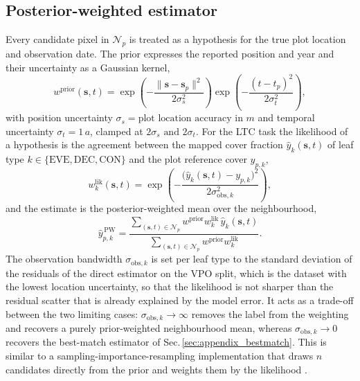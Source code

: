\documentclass[essd, manuscript]{copernicus}
\begin{document}
\subsection{Posterior-weighted estimator}
\label{sec:appendix_posterior}

Every candidate pixel in $\mathcal{N}_p$ is treated as a hypothesis for the true plot location and observation date. The prior expresses the reported position and year and their uncertainty as a Gaussian kernel,
\begin{equation}
w^\mathrm{prior}(\mathbf{s},t) = \exp\!\left(-\frac{\lVert \mathbf{s}-\mathbf{s}_p \rVert^2}{2\sigma_s^2}\right) \exp\!\left(-\frac{(t-t_p)^2}{2\sigma_t^2}\right),
\end{equation}
with position uncertainty $\sigma_s = \text{plot location accuracy in }\unit{m}$ and temporal uncertainty $\sigma_t = 1\,\unit{a}$, clamped at $2\sigma_s \text{ and } 2\sigma_t$. For the LTC task the likelihood of a hypothesis is the agreement between the mapped cover fraction $\hat{y}_k(\mathbf{s},t)$ of leaf type $k \in \{\mathrm{EVE},\mathrm{DEC},\mathrm{CON}\}$ and the plot reference cover $y_{p,k}$,
\begin{equation}
w^\mathrm{lik}_k(\mathbf{s},t) = \exp\!\left(-\frac{\bigl(\hat{y}_k(\mathbf{s},t)-y_{p,k}\bigr)^2}{2\sigma_{\mathrm{obs},k}^2}\right),
\end{equation}
and the estimate is the posterior-weighted mean over the neighbourhood,
\begin{equation}
\hat{y}^{\,\mathrm{PW}}_{p,k} = \frac{\sum_{(\mathbf{s},t)\in\mathcal{N}_p} w^\mathrm{prior} w^\mathrm{lik}_k \,\hat{y}_k(\mathbf{s},t)}{\sum_{(\mathbf{s},t)\in\mathcal{N}_p} w^\mathrm{prior} w^\mathrm{lik}_k}.
\end{equation}
The observation bandwidth $\sigma_{\mathrm{obs},k}$ is set per leaf type to the standard deviation of the residuals of the direct estimator on the VPO split, which is the dataset with the lowest location uncertainty, so that the likelihood is not sharper than the residual scatter that is already explained by the model error. It acts as a trade-off between the two limiting cases: $\sigma_{\mathrm{obs},k}\!\to\!\infty$ removes the label from the weighting and recovers a purely prior-weighted neighbourhood mean, whereas $\sigma_{\mathrm{obs},k}\!\to\!0$ recovers the best-match estimator of Sec.\,\ref{sec:appendix_bestmatch}. This is similar to a sampling-importance-resampling implementation that draws $n$ candidates directly from the prior and weights them by the likelihood \citep{lobo_bayesian_2020}. 
\end{document}
